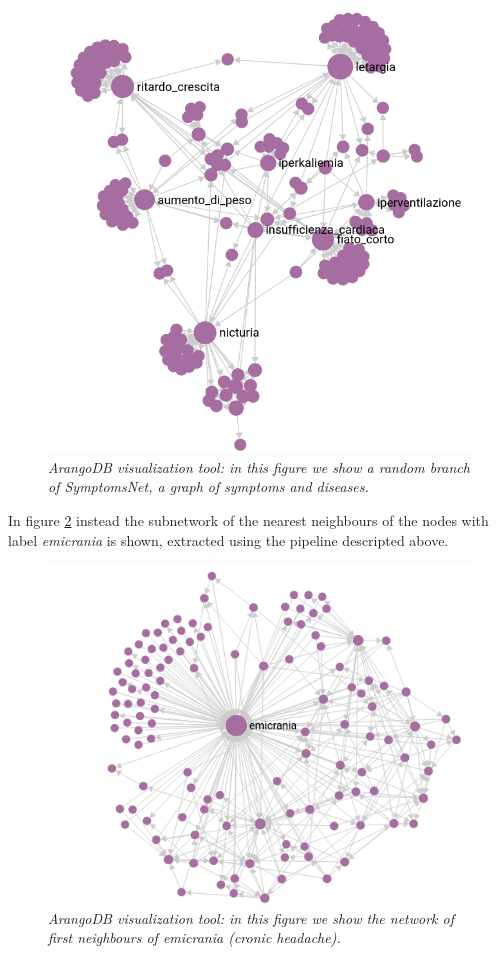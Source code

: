 \documentclass[11pt,twocolumn]{article}
\begin{document}
\begin{figure}[ht!]
   \includegraphics[width=\linewidth]{images/Sym_Net_crop.png}
   \caption{\small{\textit{ArangoDB visualization tool: in this figure we show a random branch of SymptomsNet, a graph of symptoms and diseases.}}}
   \label{fig:3}
\end{figure}

In figure \ref{fig:4} instead the subnetwork of the nearest neighbours of the nodes with label \textit{emicrania} is shown, extracted using the pipeline descripted above.

\begin{figure}[ht!]
   \includegraphics[width=\linewidth]{images/neigh_emicrania.png}
   \caption{\small{\textit{ArangoDB visualization tool: in this figure we show the network of first neighbours of \textit{emicrania} (cronic headache).}}}
   \label{fig:4}
\end{figure}
\end{document}

